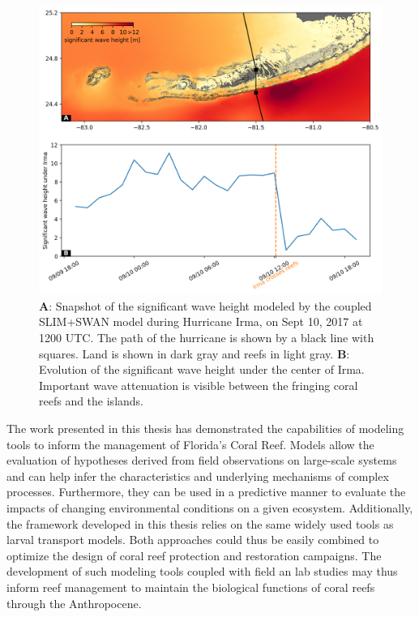 \begin{figure}
	\centering
	\includegraphics[width=\textwidth]{chapters/conclusions/figures/swh_curve.png}
	\caption{\textbf{A}: Snapshot of the significant wave height modeled by the coupled SLIM+SWAN model during Hurricane Irma, on Sept 10, 2017 at 1200 UTC. The path of the hurricane is shown by a black line with squares. Land is shown in dark gray and reefs in light gray. \textbf{B}: Evolution of the significant wave height under the center of Irma. Important wave attenuation is visible between the fringing coral reefs and the islands.}
	\label{ccl:swh}
\end{figure}


The work presented in this thesis has demonstrated the capabilities of modeling tools to inform the management of Florida's Coral Reef. Models allow the evaluation of hypotheses derived from field observations on large-scale systems and can help infer the characteristics and underlying mechanisms of complex processes. Furthermore, they can be used in a predictive manner to evaluate the impacts of changing environmental conditions on a given ecosystem. Additionally, the framework developed in this thesis relies on the same widely used tools as larval transport models. Both approaches could thus be easily combined to optimize the design of coral reef protection and restoration campaigns. The development of such modeling tools coupled with field an lab studies may thus inform reef management to maintain the biological functions of coral reefs through the Anthropocene.